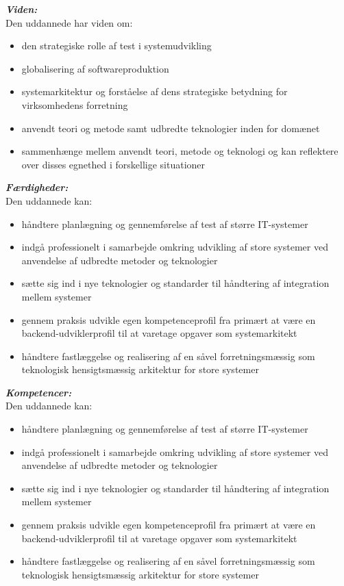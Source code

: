 \documentclass{report}
\begin{document}
\noindent\textbf{\textit{Viden:}}\\
Den uddannede har viden om:
\begin{itemize}
    \item den strategiske rolle af test i systemudvikling
    \item globalisering af softwareproduktion
    \item systemarkitektur og forståelse af dens strategiske betydning for virksomhedens forretning
    \item anvendt teori og metode samt udbredte teknologier inden for domænet
    \item sammenhænge mellem anvendt teori, metode og teknologi og kan reflektere over disses egnethed i forskellige situationer
\end{itemize}
\noindent\textbf{\textit{Færdigheder:}}\\
Den uddannede kan:
\begin{itemize}
    \item håndtere planlægning og gennemførelse af test af større IT-systemer
    \item indgå professionelt i samarbejde omkring udvikling af store systemer ved anvendelse af udbredte metoder og teknologier
    \item sætte sig ind i nye teknologier og standarder til håndtering af integration mellem systemer
    \item gennem praksis udvikle egen kompetenceprofil fra primært at være en backend-udviklerprofil til at varetage opgaver som systemarkitekt
    \item håndtere fastlæggelse og realisering af en såvel forretningsmæssig som teknologisk hensigtsmæssig arkitektur for store systemer
\end{itemize}
\noindent\textbf{\textit{Kompetencer:}}\\
Den uddannede kan:
\begin{itemize}
    \item håndtere planlægning og gennemførelse af test af større IT-systemer
    \item indgå professionelt i samarbejde omkring udvikling af store systemer ved anvendelse af udbredte metoder og teknologier
    \item sætte sig ind i nye teknologier og standarder til håndtering af integration mellem systemer
    \item gennem praksis udvikle egen kompetenceprofil fra primært at være en backend-udviklerprofil til at varetage opgaver som systemarkitekt
    \item håndtere fastlæggelse og realisering af en såvel forretningsmæssig som teknologisk hensigtsmæssig arkitektur for store systemer
\end{itemize}
\end{document}
